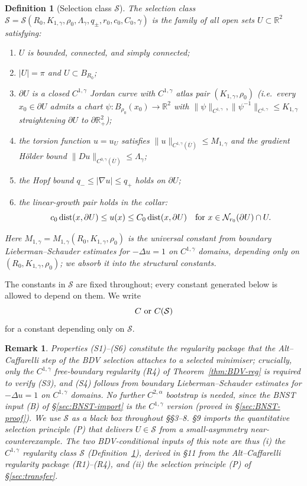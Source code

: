 \documentclass[11pt]{amsart}
\newtheorem{remark}[theorem]{Remark}
\newtheorem{definition}[theorem]{Definition}
\newcommand{\R}{\mathbb R}
\newcommand{\Sclass}{\mathcal S}
\begin{document}
\begin{definition}[Selection class \(\Sclass\)]\label{def:Sclass}
The \emph{selection class} \(\Sclass=\Sclass(R_0,K_{1,\gamma},\rho_0,
\Lambda_\gamma,q_\pm,r_0,c_0,C_0,\gamma)\) is the family of all open
sets \(U\subset\R^2\) satisfying:
\begin{enumerate}[label=(S\arabic*)]
\item \(U\) is bounded, connected, and simply connected;\label{S1}
\item \(|U|=\pi\) and \(U\subset B_{R_0}\);\label{S2}
\item \(\partial U\) is a closed \(C^{1,\gamma}\) Jordan curve with
$C^{1,\gamma}$ atlas pair $(K_{1,\gamma},\rho_0)$ \textup{(}i.e.\
every \(x_0\in\partial U\) admits a chart
\(\psi:B_{\rho_0}(x_0)\to\R^2\) with
\(\|\psi\|_{C^{1,\gamma}},\|\psi^{-1}\|_{C^{1,\gamma}}\le K_{1,\gamma}\)
straightening \(\partial U\) to \(\partial\R^2_+\)\textup{)};\label{S3}
\item the torsion function $u=u_U$ satisfies
$\|u\|_{C^{1,\gamma}(\overline U)}\le M_{1,\gamma}$ and the
gradient Hölder bound $\|Du\|_{C^{0,\gamma}(\overline U)}\le
\Lambda_\gamma$;\label{S4}
\item the Hopf bound \(q_-\le|\nabla u|\le q_+\) holds on
\(\partial U\);\label{S5}
\item the linear-growth pair holds in the collar:
\[
   c_0\,\mathrm{dist}(x,\partial U)\le u(x)\le C_0\,
   \mathrm{dist}(x,\partial U)
   \quad\hbox{for }x\in\mathcal N_{r_0}(\partial U)\cap U.
\]\label{S6}
\end{enumerate}
Here $M_{1,\gamma}=M_{1,\gamma}(R_0,K_{1,\gamma},\rho_0)$ is the
universal constant from boundary Lieberman--Schauder estimates for
$-\Delta u=1$ on $C^{1,\gamma}$ domains, depending only on
$(R_0,K_{1,\gamma},\rho_0)$; we absorb it into the structural
constants.
\end{definition}

The constants in \(\Sclass\) are fixed throughout; every constant
generated below is allowed to depend on them.  We write
\[
   C\ \hbox{or}\ C(\Sclass)
\]
for a constant depending only on \(\Sclass\).

\begin{remark}\label{rem:S-source}
Properties (S1)--(S6) constitute the regularity package that the
Alt--Caffarelli step of the BDV selection attaches to a selected
minimiser; crucially, only the $C^{1,\gamma}$ free-boundary regularity
(R4) of Theorem~\ref{thm:BDV-reg} is required to verify (S3), and (S4)
follows from boundary Lieberman--Schauder estimates for $-\Delta u=1$
on $C^{1,\gamma}$ domains.  No further $C^{2,\alpha}$ bootstrap is
needed, since the BNST input (B) of \S\ref{sec:BNST-import} is the
$C^{1,\gamma}$ version (proved in \S\ref{sec:BNST-proof}).  We use
$\Sclass$ as a black box throughout \S\S3--8.  \S9 imports the
quantitative selection principle (P) that delivers $U\in\Sclass$ from
a small-asymmetry near-counterexample.  The two BDV-conditional
inputs of this note are thus (i) the $C^{1,\gamma}$ regularity class
$\Sclass$ (Definition~\ref{def:Sclass}), derived in \S11 from the
Alt--Caffarelli regularity package (R1)--(R4), and (ii) the selection
principle (P) of \S\ref{sec:transfer}.
\end{remark}
\end{document}
